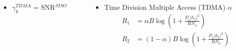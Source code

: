 \documentclass[xcolor=dvipsnames,aspectratio=169]{beamer}
\begin{document}
{\begin{columns}
\begin{column}{4cm}
         \vspace{-.2in}
        \begin{itemize}
            \item \textcolor{TZTeal}{$\gamma_k^{TDMA}$ = SNR$^{SISO}$}
        \end{itemize}
        \end{column}
        \begin{column}{8cm}
        \begin{itemize}
         \item \textcolor{TZTeal}{Time Division Multiple Access (TDMA) $\alpha$
          \begin{equation}
            \begin{array}{rl}
                    R_1&= \alpha B\log\left(1+\frac{P_1|h_1|^2}{BN_o}\right)\\
                    R_2&= (1-\alpha) B\log\left(1+\frac{P_2|h_2|^2}{BN_o}\right)\\
            \end{array}
          \end{equation}}
         \vspace{-.2in}
        \end{itemize}       
        \end{column}
    \end{columns}
}
\end{document}
